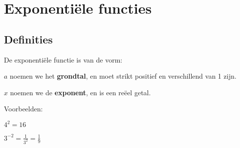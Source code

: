 

\section{Exponenti\"ele functies}

\subsection{Definities}

De exponenti\"ele functie is van de vorm:

\noindent \vspace{0.2cm}


\vspace{0.5cm}


\noindent $a$ noemen we het \textbf{grondtal}, en moet strikt positief
en verschillend van 1 zijn.

\noindent $x$ noemen we de \textbf{exponent}, en is een re\"eel getal.

\medskip{}


Voorbeelden: 

${\displaystyle 4^{2}=16}$

${\displaystyle 3^{-2}=\frac{1}{3^{2}}=\frac{1}{9}}$

